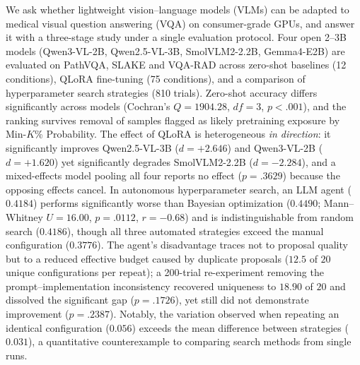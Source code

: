 We ask whether lightweight vision--language models (VLMs) can be adapted to
medical visual question answering (VQA) on consumer-grade GPUs, and answer it
with a three-stage study under a single evaluation protocol. Four open 2--3B
models (Qwen3-VL-2B, Qwen2.5-VL-3B, SmolVLM2-2.2B, Gemma4-E2B) are evaluated on
PathVQA, SLAKE and VQA-RAD across zero-shot baselines (12 conditions), QLoRA
fine-tuning (75 conditions), and a comparison of hyperparameter search
strategies (810 trials). Zero-shot accuracy differs significantly across models
(Cochran's $Q = 1904.28$, $\mathit{df} = 3$, $p < .001$), and the ranking
survives removal of samples flagged as likely pretraining exposure by
Min-$K$\% Probability. The effect of QLoRA is heterogeneous \emph{in direction}:
it significantly improves Qwen2.5-VL-3B ($d = +2.646$) and Qwen3-VL-2B
($d = +1.620$) yet significantly degrades SmolVLM2-2.2B ($d = -2.284$), and a
mixed-effects model pooling all four reports no effect ($p = .3629$) because the
opposing effects cancel. In autonomous hyperparameter search, an LLM agent
($0.4184$) performs significantly worse than Bayesian optimization ($0.4490$;
Mann--Whitney $U = 16.00$, $p = .0112$, $r = -0.68$) and is indistinguishable
from random search ($0.4186$), though all three automated strategies exceed the
manual configuration ($0.3776$). The agent's disadvantage traces not to proposal
quality but to a reduced effective budget caused by duplicate proposals ($12.5$
of $20$ unique configurations per repeat); a 200-trial re-experiment removing
the prompt--implementation inconsistency recovered uniqueness to $18.90$ of $20$
and dissolved the significant gap ($p = .1726$), yet still did not demonstrate
improvement ($p = .2387$). Notably, the variation observed when repeating an
identical configuration ($0.056$) exceeds the mean difference between strategies
($0.031$), a quantitative counterexample to comparing search methods from single
runs.
